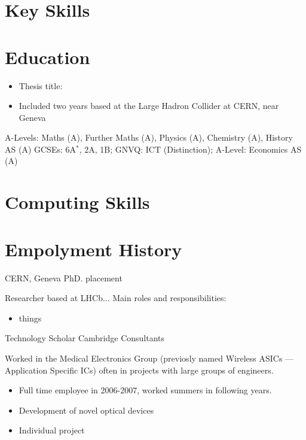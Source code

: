 \makecvtitle


\section{Key Skills}


\section{Education}
{
  \begin{itemize}
    \item Thesis title:
    \item Included two years based at the Large Hadron Collider at CERN, near Geneva
  \end{itemize}
}
{A-Levels: Maths (A), Further Maths (A), Physics (A), Chemistry (A), History AS (A)}
{GCSEs: 6A$^*$, 2A, 1B; GNVQ: ICT (Distinction); A-Level: Economics AS (A)}


\section{Computing Skills}


\section{Empolyment History}
{CERN, Geneva}
{PhD. placement}
{}{}
{
  Researcher based at LHCb...
  Main roles and responsibilities:
  \begin{itemize}
    \item things
  \end{itemize}
}
{Technology Scholar}
{Cambridge Consultants}
{}{}
{
  Worked in the Medical Electronics Group (previosly named Wireless ASICs --- Application Specific
  ICs) often in projects with large groups of engineers.
  \begin{itemize}
    \item Full time employee in 2006-2007, worked summers in following years.
    \item Development of novel optical devices
    \item Individual project
  \end{itemize}
}


